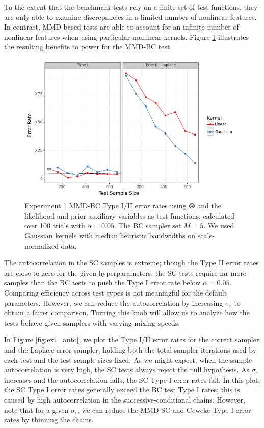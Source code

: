 \documentclass[a4paper,11pt]{article}
\begin{document}
To the extent that the benchmark tests rely on a finite set of test functions, they are only able to examine discrepancies in a limited number of nonlinear features. In contrast, MMD-based tests are able to account for an infinite number of nonlinear features when using particular nonlinear kernels. Figure \ref{fig:ex1_kernel} illustrates the resulting benefits to power for the MMD-BC test. 
\begin{figure}
    \centering
    \includegraphics[width=\textwidth]{figures/gandy_scott_kernel.png}
    \caption{Experiment 1 MMD-BC Type I/II error rates using $\mathbf{\Theta}$ and the likelihood and prior auxiliary variables as test functions, calculated over 100 trials with $\alpha=0.05$. The BC sampler set $M=5$. We used Gaussian kernels with median heuristic bandwidths on scale-normalized data.}
    \label{fig:ex1_kernel}
\end{figure}

The autocorrelation in the SC samples is extreme; though the Type II error rates are close to zero for the given hyperparameters, the SC tests require far more samples than the BC tests to push the Type I error rate below $\alpha=0.05$. Comparing efficiency across test types is not meaningful for the default parameters. However, we can reduce the autocorrelation by increasing $\sigma_{\epsilon}$ to obtain a fairer comparison. Turning this knob will allow us to analyze how the tests behave given samplers with varying mixing speeds. 

In Figure \ref{fig:ex1_auto}, we plot the Type I/II error rates for the correct sampler and the Laplace error sampler, holding both the total sampler iterations used by each test and the test sample sizes fixed. As we might expect, when the sample autocorrelation is very high, the SC tests always reject the null hypothesis. As $\sigma_{\epsilon}$ increases and the autocorrelation falls, the SC Type I error rates fall. In this plot, the SC Type I error rates generally exceed the BC test Type I rates; this is caused by high autocorrelation in the successive-conditional chains. However, note that for a given $\sigma_{\epsilon}$, we can reduce the MMD-SC and Geweke Type I error rates by thinning the chains.
\end{document}
